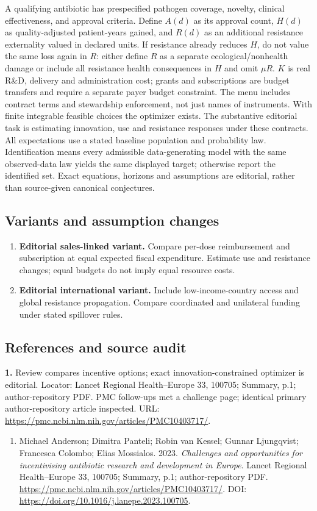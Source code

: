 \documentclass[11pt,a4paper]{article}
\begin{document}
A qualifying antibiotic has prespecified pathogen coverage, novelty, clinical effectiveness, and approval criteria. Define \(A(d)\) as its approval count, \(H(d)\) as quality-adjusted patient-years gained, and \(R(d)\) as an additional resistance externality valued in declared units. If resistance already reduces \(H\), do not value the same loss again in \(R\): either define \(R\) as a separate ecological/nonhealth damage or include all resistance health consequences in \(H\) and omit \(\mu R\). \(K\) is real R\&D, delivery and administration cost; grants and subscriptions are budget transfers and require a separate payer budget constraint. The menu includes contract terms and stewardship enforcement, not just names of instruments. With finite integrable feasible choices the optimizer exists. The substantive editorial task is estimating innovation, use and resistance responses under these contracts. All expectations use a stated baseline population and probability law. Identification means every admissible data-generating model with the same observed-data law yields the same displayed target; otherwise report the identified set. Exact equations, horizons and assumptions are editorial, rather than source-given canonical conjectures.
\subsection*{Variants and assumption changes}
\begin{enumerate}
\item \textbf{Editorial sales-linked variant.} Compare per-dose reimbursement and subscription at equal expected fiscal expenditure. Estimate use and resistance changes; equal budgets do not imply equal resource costs.
\item \textbf{Editorial international variant.} Include low-income-country access and global resistance propagation. Compare coordinated and unilateral funding under stated spillover rules.
\end{enumerate}
\subsection*{References and source audit}
\textbf{1.} Review compares incentive options; exact innovation-constrained optimizer is editorial. Locator: Lancet Regional Health–Europe 33, 100705; Summary, p.1; author-repository PDF. PMC follow-ups met a challenge page; identical primary author-repository article inspected. URL: \url{https://pmc.ncbi.nlm.nih.gov/articles/PMC10403717/}.
\begin{enumerate}\raggedright
\item\hypertarget{definitions:source:30007728:1}{} Michael Anderson; Dimitra Panteli; Robin van Kessel; Gunnar Ljungqvist; Francesca Colombo; Elias Mossialos. 2023. \emph{Challenges and opportunities for incentivising antibiotic research and development in Europe}. Lancet Regional Health–Europe 33, 100705; Summary, p.1; author-repository PDF.
\url{https://pmc.ncbi.nlm.nih.gov/articles/PMC10403717/}.
DOI: \url{https://doi.org/10.1016/j.lanepe.2023.100705}.
\end{enumerate}
\end{document}
